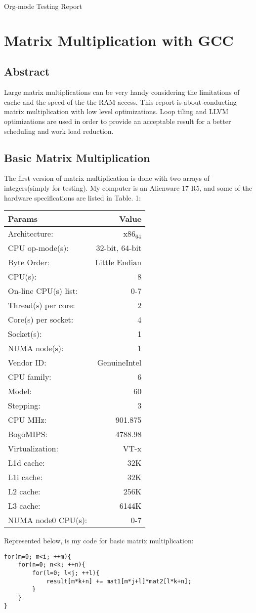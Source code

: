 \documentclass[11pt]{article}
\author{潘安}
\date{\today}
\title{}
\begin{document}
\tableofcontents

Org-mode Testing Report
\section{Matrix Multiplication with GCC}
\label{sec:orgheadline3}

\subsection{Abstract}
\label{sec:orgheadline1}
Large matrix multiplications can be very handy considering 
the limitations of cache and the speed of the the RAM access.
This report is about conducting matrix multiplication with 
low level optimizations. Loop tiling and LLVM optimizations
are used in order to provide an acceptable result for a better
scheduling and work load reduction.

\subsection{Basic Matrix Multiplication}
\label{sec:orgheadline2}
The first version of matrix multiplication is done with
 two arrays of integers(simply for testing). My computer is 
an Alienware 17 R5, and some of the hardware specifications are listed
in Table. 1:


\begin{center}
\begin{tabular}{lr}
Params & Value\\
\hline
Architecture: & x86\(_{\text{64}}\)\\
CPU op-mode(s): & 32-bit, 64-bit\\
Byte Order: & Little Endian\\
CPU(s): & 8\\
On-line CPU(s) list: & 0-7\\
Thread(s) per core: & 2\\
Core(s) per socket: & 4\\
Socket(s): & 1\\
NUMA node(s): & 1\\
Vendor ID: & GenuineIntel\\
CPU family: & 6\\
Model: & 60\\
Stepping: & 3\\
CPU MHz: & 901.875\\
BogoMIPS: & 4788.98\\
Virtualization: & VT-x\\
L1d cache: & 32K\\
L1i cache: & 32K\\
L2 cache: & 256K\\
L3 cache: & 6144K\\
NUMA node0 CPU(s): & 0-7\\
\end{tabular}
\end{center}


Represented below, is my code for basic matrix multiplication:
\begin{verbatim}
for(m=0; m<i; ++m){
    for(n=0; n<k; ++n){
        for(l=0; l<j; ++l){
            result[m*k+n] += mat1[m*j+l]*mat2[l*k+n];
        }
    }
}
\end{verbatim}
\end{document}
